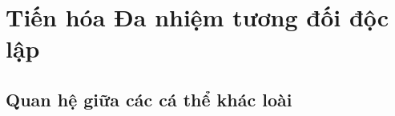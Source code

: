\section{Tiến hóa Đa nhiệm tương đối độc lập} %
\label{sec:Tiến hóa Đa nhiệm tương đối độc lập}

\subsection{Quan hệ giữa các cá thể khác loài} %
\label{sub:Quan hệ giữa các cá thể khác loài}

\begin{frame}{}
  
\end{frame}


